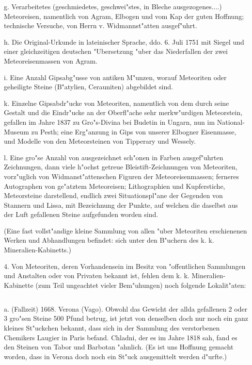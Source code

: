 \documentclass[a4paper, 11pt, oneside, polutonikogreek, german]{article}
\begin{document}
g. Verarbeitetes (geschmiedetes, geschwei"stes, in Bleche ausgezogenes....) Meteoreisen, namentlich von Agram, Elbogen und vom Kap der guten Hoffnung; technische Versuche, von Herrn v. Widmannst"atten ausgef"uhrt.

h. Die Original-Urkunde in lateinischer Sprache, ddo. 6. Juli 1751 mit Siegel und einer gleichzeitigen deutschen "Ubersetzung "uber das Niederfallen der zwei Meteoreisenmassen von Agram.

i. Eine Anzahl Gipsabg"usse von antiken M"unzen, worauf Meteoriten oder geheiligte Steine (B"atylien, Cerauniten) abgebildet sind.

k. Einzelne Gipsabdr"ucke von Meteoriten, namentlich von dem durch seine Gestalt und die Eindr"ucke an der Oberfl"ache sehr merkw"urdigen Meteorstein, gefallen im Jahre 1837 zu Gro"s-Divina bei Budetin in Ungarn, nun im National-Museum zu Pesth; eine Erg"anzung in Gips von unserer Elbogner Eisenmasse, und Modelle von den Meteorsteinen von Tipperary und Wessely.

l. Eine gro"se Anzahl von ausgezeichnet sch"onen in Farben ausgef"uhrten Zeichnungen, dann viele h"ochst getreue Bleistift-Zeichnungen von Meteoriten, vorz"uglich von Widmanst"attenschen Figuren der Meteoreisenmassen; ferneres Autographen von ge"atztem Meteoreisen; Lithographien und Kupferstiche, Meteorsteine darstellend, endlich zwei Situationspl"ane der Gegenden von Stannern und Lissa, mit Bezeichnung der Punkte, auf welchen die daselbst aus der Luft gefallenen Steine aufgefunden worden sind.

(Eine fast vollst"andige kleine Sammlung von allen "uber Meteoriten erschienenen Werken und Abhandlungen befindet: sich unter den B"uchern des k. k. Mineralien-Kabinetts.)

4. Von Meteoriten, deren Vorhandensein im Besitz von "offentlichen Sammlungen und Anstalten oder von Privaten bekannt ist, fehlen dem k. k. Mineralien-Kabinette (zum Teil ungeachtet vieler Bem"uhungen) noch folgende Lokalit"aten:
\subsection{}
\paragraph{}
a. (Fallzeit) 1668. Verona (Vago). Obwohl das Gewicht der allda gefallenen 2 oder 3 gro"sen Steine 500 Pfund betrug, ist jetzt von denselben doch nur noch ein ganz kleines St"uckchen bekannt, dass sich in der Sammlung des verstorbenen Chemikers Laugier in Paris befand. Chladni, der es im Jahre 1818 sah, fand es den Steinen von Tabor und Barbotan "ahnlich. (Es ist uns Hoffnung gemacht worden, dass in Verona doch noch ein St"uck ausgemittelt werden d"urfte.)
\end{document}
